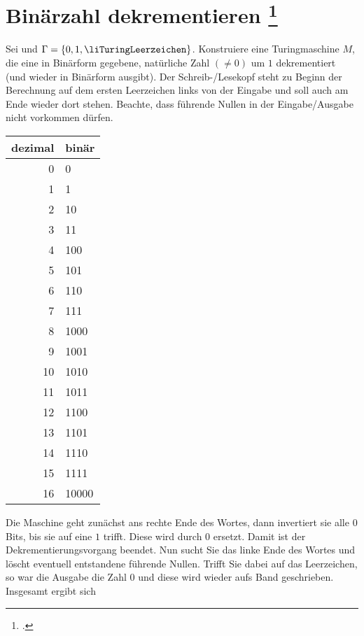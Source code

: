 \documentclass{lehramt-informatik-aufgabe}
\begin{document}
\section{Binärzahl dekrementieren
\footcite[Aufgabe 3]{theo:ab:3}}

Sei  und $\Gamma = \{ 0, 1, \liTuringLeerzeichen \}$.
Konstruiere eine Turingmaschine $M$, die eine in Binärform gegebene,
natürliche Zahl $(\neq 0)$ um $1$ dekrementiert (und wieder in Binärform
ausgibt). Der Schreib-/Lesekopf steht zu Beginn der Berechnung auf dem
ersten Leerzeichen links von der Eingabe und soll auch am Ende wieder
dort stehen. Beachte, dass führende Nullen in der Eingabe/Ausgabe nicht
vorkommen dürfen.

\begin{liAntwort}
\begin{center}
\begin{tabular}{r|l}
\textbf{dezimal} & \textbf{binär} \\\hline
0 & 0 \\
1 & 1 \\
2 & 10 \\
3 & 11 \\
4 & 100 \\
5 & 101 \\
6 & 110 \\
7 & 111 \\
8 & 1000 \\
9 & 1001 \\
10 & 1010 \\
11 & 1011 \\
12 & 1100 \\
13 & 1101 \\
14 & 1110 \\
15 & 1111 \\
16 & 10000 \\
\end{tabular}
\end{center}

\bigskip

\noindent
Die Maschine geht zunächst ans rechte Ende des Wortes, dann invertiert
sie alle $0$ Bits, bis sie auf eine $1$ trifft. Diese wird durch $0$
ersetzt. Damit ist der Dekrementierungsvorgang beendet. Nun sucht Sie
das linke Ende des Wortes und löscht eventuell entstandene führende
Nullen. Trifft Sie dabei auf das Leerzeichen, so war die Ausgabe die
Zahl $0$ und diese wird wieder aufs Band geschrieben. Insgesamt ergibt
sich


\end{liAntwort}
\end{document}
